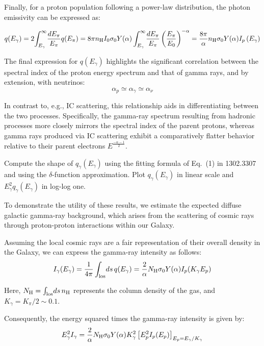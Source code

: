 Finally, for a proton population following a power-law distribution, the photon emissivity can be expressed as:
%
\begin{remark}
\begin{equation}
q(E_\gamma) = 2 \! \int_{E_\gamma}^\infty \! \frac{dE_\pi}{E_\pi} q(E_\pi) = 
8 \pi n_{\rm H} I_0 \sigma_0 Y(\alpha) \int_{E_\gamma}^\infty \! \frac{dE_\pi}{E_\pi}  \left(\frac{E_\pi}{E_0} \right)^{-\alpha}
= \frac{8 \pi}{\alpha} n_{\rm H}  \sigma_0 Y(\alpha) I_p\left(E_\gamma \right)
\end{equation}
\end{remark}

The final expression for \( q(E_\gamma) \) highlights the significant correlation between the spectral index of the proton energy spectrum and that of gamma rays, and by extension, with neutrinos:
%
\[
\alpha_p \simeq \alpha_\gamma \simeq \alpha_\nu
\]

In contrast to, e.g., IC scattering, this relationship aids in differentiating between the two processes. Specifically, the gamma-ray spectrum resulting from hadronic processes more closely mirrors the spectral index of the parent protons, whereas gamma rays produced via IC scattering exhibit a comparatively flatter behavior relative to their parent electrons $E^{\frac{-\alpha-1}{2}}$.

\begin{problem}
Compute the shape of $q_\gamma(E_\gamma)$ using the fitting formula of Eq.~(1) in 1302.3307 and using the $\delta$-function approximation. Plot $q_\gamma(E_\gamma)$ in linear scale and $E_\gamma^2q_\gamma(E_\gamma)$ in log-log one. 
\end{problem}

To demonstrate the utility of these results, we estimate the expected diffuse galactic gamma-ray background, which arises from the scattering of cosmic rays through proton-proton interactions within our Galaxy.

Assuming the local cosmic rays are a fair representation of their overall density in the Galaxy, we can express the gamma-ray intensity as follows:
%
\[
I_\gamma(E_\gamma) = \frac{1}{4\pi} \int_{\rm los} \! ds \, q(E_\gamma) = \frac{2}{\alpha} N_{\rm H} \sigma_0 Y(\alpha) I_p(K_\gamma E_p) 
\]

Here, \( N_{\rm H} = \int_{\rm los} \! ds \, n_{\rm H} \) represents the column density of the gas, and \( K_\gamma = K_\pi / 2 \sim 0.1 \).

Consequently, the energy squared times the gamma-ray intensity is given by:
%
\[
E_\gamma^2 I_\gamma = \frac{2}{\alpha} N_{\rm H} \sigma_0 Y(\alpha) K_\gamma^2 \left[ E_p^2 I_p(E_p) \right]_{E_p = E_\gamma / K_\gamma}
\]


